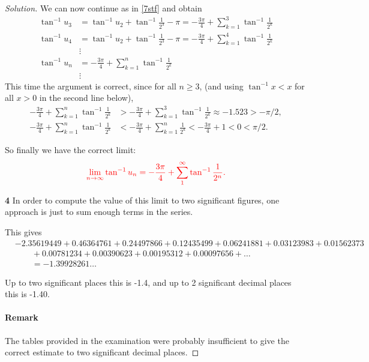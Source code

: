 \documentclass[11pt,a4paper]{report}
\theoremstyle{plain}
\theoremstyle{definition}
\begin{document}
\begin{proof}[Solution]
We can now continue as in \eqref{7stf} and obtain 
\begin{equation} \label{}
\begin{aligned}
\tan^{-1} u_3 &=  \tan^{-1} u_2 + \tan^{-1} \frac{1}{2^3} -\pi  = -\frac{3\pi}{4} + \sum_{k=1}^3 \tan^{-1}\frac{1}{2^k} \\
\tan^{-1} u_4 &=  \tan^{-1} u_2 + \tan^{-1} \frac{1}{2^3} -\pi  = -\frac{3\pi}{4} + \sum_{k=1}^4 \tan^{-1}\frac{1}{2^k} \\
	&\vdots\\
\tan^{-1} u_n &=    -\frac{3\pi}{4} + \sum_{k=1}^n \tan^{-1}\frac{1}{2^k} \\
	&\vdots
\end{aligned} 
\end{equation} 
This time the argument is correct, since for all $ n \geq 3 $, (and using $ \tan^{-1}x < x $ for all $ x> 0 $ in the second line below),
\begin{align*} 
-\frac{3\pi}{4} + \sum_{k=1}^n \tan^{-1}\frac{1}{2^k}  &> -\frac{3\pi}{4} + \sum_{k=1}^3 \tan^{-1}\frac{1}{2^k} \approx -1.523 >-\pi/2,\\
-\frac{3\pi}{4} + \sum_{k=1}^n \tan^{-1}\frac{1}{2^k}  &< -\frac{3\pi}{4} + \sum_{k=1}^n \frac{1}{2^k} <  -\frac{3\pi}{4} + 1 <0 <\pi/2.
\end{align*} 

So finally we have the correct limit:
\begin{equation} \label{7wff} 
\color{red}  \lim_{n\to\infty } \tan^{-1} u_n = -\dfrac{3\pi}{4} + \sum_1^\infty \tan^{-1} \dfrac{1}{2^n}.
\end{equation} 

\bigskip
\noindent \textbf{4} \quad 
In order to compute the value of this limit to two significant figures, one approach is just to sum enough terms in the series.

This gives 
\begin{align*} 
&-2.35619449  + 0.46364761 + 0.24497866 + 0.12435499 + 0.06241881 + 0.03123983 + 0.01562373 \\
& \qquad + 0.00781234 + 0.00390623 + 0.00195312 + 0.00097656 +\dots  \\
& \qquad =  -1.39928261\ldots
\end{align*} 

Up to two significant places this is -1.4, and up to 2 significant decimal places this is -1.40.

\medskip
\paragraph{Remark} The tables provided in the examination were probably insufficient to give the correct estimate to two significant decimal places.


\end{proof}
\end{document}
